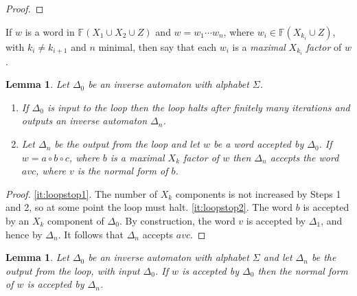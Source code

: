 \documentclass[a4paper,12pt]{article}
\renewcommand{\a}{\alpha }
\renewcommand{\b}{\beta }
\newcommand{\g}{\gamma }
\newcommand{\D}{\Delta }
\newcommand{\T}{\Theta }
\renewcommand{\L}{\Lambda }
\renewcommand{\S}{\Sigma }
\newtheorem{lemma}[theorem]{Lemma}
\numberwithin{equation}{section}
\numberwithin{figure}{section}
\newcommand{\FF}{\ensuremath{\mathbb{F}}}
\newcommand{\be}{\begin{enumerate}}
\newcommand{\ee}{\end{enumerate}}
\begin{document}
\begin{proof}

\end{proof}
If $w$ is a word in $\FF(X_1\cup X_2\cup Z)$ and $w=w_1\cdots w_n$,
where $w_i\in \FF(X_{k_i}\cup Z)$, with $k_i\neq k_{i+1}$ and $n$
minimal, then  say that each $w_i$ is a \emph {maximal} $X_{k_i}$
\emph{factor}
of $w$.
\begin{lemma}\label{lem:loopstop}
Let $\D_0$ be an inverse automaton with alphabet $\S$.
\be
\item\label{it:loopstop1}
If $\D_0$ is input  to  the loop then the loop halts after
finitely many iterations and outputs an inverse automaton  $\D_n$.
\item\label{it:loopstop2} Let $\D_n$ be the output from the loop and let $w$ be a word
accepted by $\D_0$. If $w=a\circ b \circ c$,
where $b$ is a maximal $X_k$ factor of $w$ then $\D_n$ accepts
the word $avc$, where $v$ is the normal form of $b$.
\ee
\end{lemma}
\begin{proof}
\ref{it:loopstop1}. The number of $X_k$ components is not
increased by Steps 1 and 2, so at some point the loop must halt.
\noindent \ref{it:loopstop2}. The word $b$ is accepted by an $X_k$
component of $\D_0$. By construction, the word $v$ is accepted by
$\D_1$, and hence by $\D_n$. It follows that $\D_n$ accepts $avc$.
\end{proof}
\begin{lemma}\label{lem:nfacc}
Let $\D_0$ be an inverse automaton with alphabet $\S$ and let
$\D_n$ be the output from the loop, with input $\D_0$. If $w$ is
accepted by $\D_0$ then the normal form of $w$ is accepted by $\D_n$.
\end{lemma}
\end{document}
